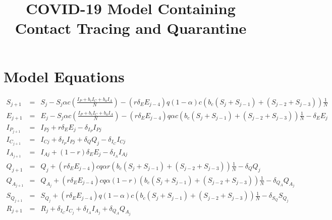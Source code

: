 \documentclass[12pt]{article}
\title{COVID-19 Model Containing Contact Tracing and Quarantine}
\date{}
\begin{document}
 

\maketitle

\section{Model Equations} \label{equations}

\begin{eqnarray}
S_{j+1} &=&  S_j - S_j \alpha c \left( \frac{I_P + b_cI_C + b_aI_A}{N}\right) -(r \delta_E E_{j-4} ) q (1-\alpha) c  (b_c (S_j + S_{j-1}) + (S_{j-2} + S_{j-3})) \frac{1}{N} \\
E_{j+1} &=& E_j - S_j \alpha c \left( \frac{I_P + b_cI_C + b_aI_A}{N}\right) -(r \delta_E E_{j-4} ) q \alpha c  (b_c (S_j + S_{j-1}) + (S_{j-2} + S_{j-3})) \frac{1}{N} - \delta_E E_j\\
I_{P_{j+1}} &=& I_{Pj} + r\delta_E E_j - \delta_{I_P} I_{Pj}\\
 I_{C_{j+1}}&=& I_{Cj} + \delta_{I_P} I_{Pj} + \delta_Q Q_j - \delta_{I_C} I_{Cj}\\
I_{A_{j+1}} &=& I_{Aj} + (1-r) \delta_E E_j  - \delta_{I_A} I_{Aj}\\
Q_{j+1} &=& Q_j + (r \delta_E E_{j-4} ) c q \alpha r (b_c (S_j + S_{j-1}) + (S_{j-2} + S_{j-3})) \frac{1}{N} - \delta_Q Q_j\\
 Q_{A_{j+1}}&=& Q_{A_{j}} +  (r \delta_E E_{j-4} ) c q \alpha (1- r) (b_c (S_j + S_{j-1}) + (S_{j-2} + S_{j-3})) \frac{1}{N} - \delta_{Q_{A}} Q_{A_{j}} \\
S_{Q_{j+1}} &=& S_{Q_{j}} + (r \delta_E E_{j-4} ) q (1- \alpha) c  (b_c (S_j + S_{j-1}) + (S_{j-2} + S_{j-3})) \frac{1}{N}  - \delta_{S_{Q}} S_{Q_{j}} \\
R_{j+1} &=& R_j + \delta_{I_{C}} I_{C_{j}} + \delta_{I_{A}} I_{A_{j}} + \delta_{Q_{A}} Q_{A_{j}}
\end{eqnarray}
\end{document}
